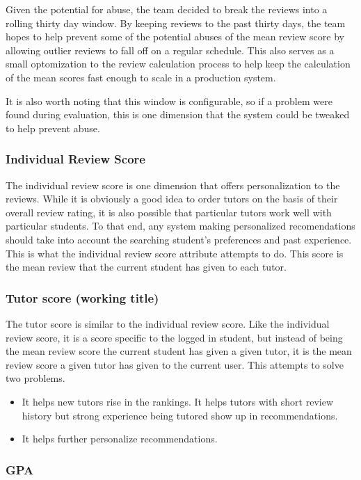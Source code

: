 Given the potential for abuse, the team decided to break the reviews into a
rolling thirty day window.  By keeping reviews to the past thirty days, the
team hopes to help prevent some of the potential abuses of the mean review
score by allowing outlier reviews to fall off on a regular schedule.  This
also serves as a small optomization to the review calculation process to help
keep the calculation of the mean scores fast enough to scale in a production
system.

It is also worth noting that this window is configurable, so if a problem were
found during evaluation, this is one dimension that the system could be
tweaked to help prevent abuse.

\subsubsection{Individual Review Score}
The individual review score is one dimension that offers personalization to
the reviews.  While it is obviously a good idea to order tutors on the basis
of their overall review rating, it is also possible that particular tutors
work well with particular students.  To that end, any system making
personalized recomendations should take into account the searching student's
preferences and past experience.  This is what the individual review score
attribute attempts to do.  This score is the mean review that the current
student has given to each tutor.  

\subsubsection{Tutor score (working title)} %

The tutor score is similar to the individual review score.  Like the
individual review score, it is a score specific to the logged in student, but
instead of being the mean review score the current student has given a given
tutor, it is the mean review score a given tutor has given to the current
user.  This attempts to solve two problems.

\begin{itemize}
\item It helps new tutors rise in the rankings.
  It helps tutors with short review history but strong experience being
  tutored show up in recommendations.
\item It helps further personalize recommendations.
\end{itemize}

\subsubsection{GPA}


